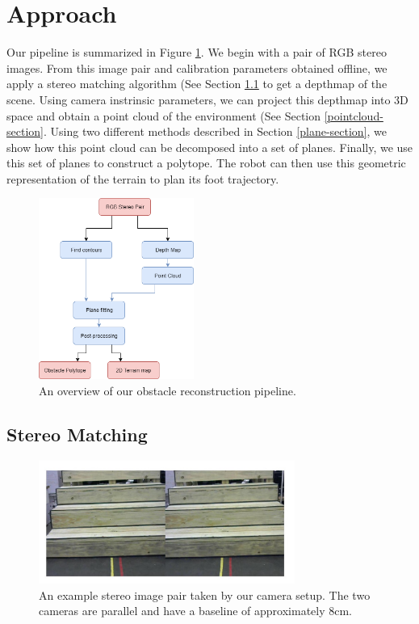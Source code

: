 \section{Approach}

Our pipeline is summarized in Figure \ref{overview-diagram}. We begin with a pair of RGB stereo images. From this image pair and calibration parameters obtained offline, we apply a stereo matching algorithm (See Section \ref{stereo-matching-section} to get a depthmap of the scene. Using camera instrinsic parameters, we can project this depthmap into 3D space and obtain a point cloud of the environment (See Section \ref{pointcloud-section}. Using two different methods described in Section \ref{plane-section}, we show how this point cloud can be decomposed into a set of planes. Finally, we use this set of planes to construct a polytope. The robot can then use this geometric representation of the terrain to plan its foot trajectory.


\begin{figure}[!h]
\centering
\includegraphics[width=2in]{Sections/Figures/Final-Project-Pipeline.png}
\caption{An overview of our obstacle reconstruction pipeline.}
\label{overview-diagram}
\end{figure}

\subsection{Stereo Matching} \label{stereo-matching-section}

\begin{figure}[!h]
\centering
\includegraphics[width=3.3in]{Sections/Figures/example_stereo_pair.jpg}
\caption{An example stereo image pair taken by our camera setup. The two cameras are parallel and have a baseline of approximately 8cm.}
\label{stereo-image-pair}
\end{figure}

